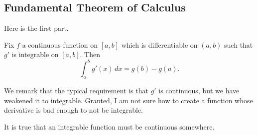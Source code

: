 \documentclass[../notes.tex]{subfiles}
\begin{document}
\subsection{Fundamental Theorem of Calculus}
Here is the first part.
\begin{theorem}
	Fix $f$ a continuous function on $[a,b]$ which is differentiable on $(a,b)$ such that $g'$ is integrable on $[a,b].$ Then
	\[\int_a^bg'(x)\,dx=g(b)-g(a).\]
\end{theorem}
We remark that the typical requirement is that $g'$ is continuous, but we have weakened it to integrable. Granted, I am not sure how to create a function whose derivative is bad enough to not be integrable.
\begin{remark}
	It is true that an integrable function must be continuous somewhere.
\end{remark}
\end{document}
